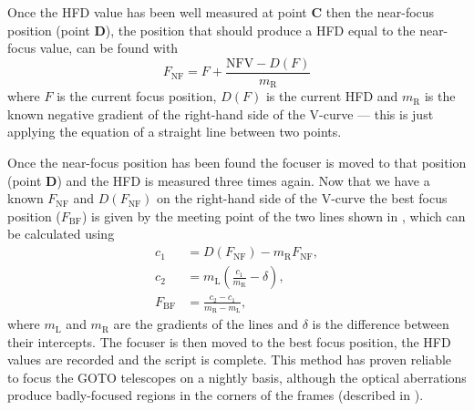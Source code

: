 \begin{colsection}
Once the HFD value has been well measured at point \textbf{C} then the near-focus position (point \textbf{D}), the position that should produce a HFD equal to the near-focus value, can be found with
%
\begin{equation}
    F_\text{NF} = F + \frac{\text{NFV} - D(F)}{m_\text{R}}
    \label{eq:nearfocus}
\end{equation}
%
where $F$ is the current focus position, $D(F)$ is the current HFD and $m_\text{R}$ is the known negative gradient of the right-hand side of the V-curve --- this is just applying the equation of a straight line between two points.

Once the near-focus position has been found the focuser is moved to that position (point \textbf{D}) and the HFD is measured three times again. Now that we have a known $F_\text{NF}$ and $D(F_\text{NF})$ on the right-hand side of the V-curve the best focus position ($F_\text{BF}$) is given by the meeting point of the two lines shown in , which can be calculated using
%
\begin{equation}
    \begin{split}
                c_1 & = D(F_\text{NF}) - m_\text{R} F_\text{NF}, \\
                c_2 & = m_\text{L}(\frac{c_1}{m_\text{R}} - \delta), \\
        F_\text{BF} & = \frac{c_2 - c_1}{m_\text{R} - m_\text{L}},
    \end{split}
    \label{eq:bestfocus}
\end{equation}
%
where $m_\text{L}$ and $m_\text{R}$ are the gradients of the lines and $\delta$ is the difference between their intercepts. The focuser is then moved to the best focus position, the HFD values are recorded and the script is complete. This method has proven reliable to focus the GOTO telescopes on a nightly basis, although the optical aberrations produce badly-focused regions in the corners of the frames (described in ).

\end{colsection}


